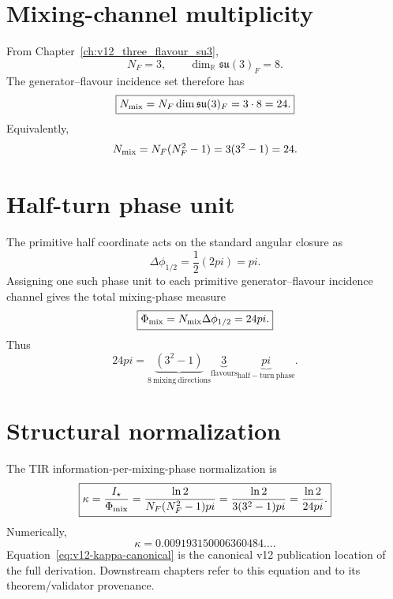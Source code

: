 \documentclass[11pt,a4paper,twoside]{book}
\def\pi{pi}%
\theoremstyle{definition}
\begin{document}
\section{Mixing-channel multiplicity}
From Chapter~\ref{ch:v12_three_flavour_su3},
\[
N_F=3,
\qquad
\dim_{\mathbb R}\mathfrak{su}(3)_F=8.
\]
The generator--flavour incidence set therefore has
\begin{equation}
\boxed{
N_{\rm mix}
=N_F\dim\mathfrak{su}(3)_F
=3\cdot8
=24.
}
\label{eq:v12-kappa-mixing-count}
\end{equation}
Equivalently,
\[
N_{\rm mix}
=N_F(N_F^2-1)
=3(3^2-1)
=24.
\]

\section{Half-turn phase unit}
The primitive half coordinate acts on the standard angular closure as
\begin{equation}
\boxed{
\Delta\phi_{1/2}
=\frac12(2\pi)
=\pi.
}
\label{eq:v12-kappa-half-turn}
\end{equation}
Assigning one such phase unit to each primitive generator--flavour incidence
channel gives the total mixing-phase measure
\begin{equation}
\boxed{
\Phi_{\rm mix}
=N_{\rm mix}\Delta\phi_{1/2}
=24\pi.
}
\label{eq:v12-kappa-mixing-phase-measure}
\end{equation}
Thus
\begin{equation}
\boxed{
24\pi
=\underbrace{(3^2-1)}_{8\ \mathrm{mixing\ directions}}
\underbrace{3}_{\mathrm{flavours}}
\underbrace{\pi}_{\mathrm{half\!\!-turn\ phase}}.
}
\label{eq:v12-kappa-denominator-factorization}
\end{equation}

\section{Structural normalization}
The TIR information-per-mixing-phase normalization is
\begin{equation}
\boxed{
\kappa
=\frac{I_\star}{\Phi_{\rm mix}}
=\frac{\ln2}{N_F(N_F^2-1)\pi}
=\frac{\ln2}{3(3^2-1)\pi}
=\frac{\ln2}{24\pi}.
}
\label{eq:v12-kappa-canonical}
\end{equation}
Numerically,
\[
\kappa
=0.009193150006360484\ldots .
\]
Equation~\eqref{eq:v12-kappa-canonical} is the canonical v12 publication
location of the full derivation.  Downstream chapters refer to this equation and
to its theorem/validator provenance.
\end{document}

